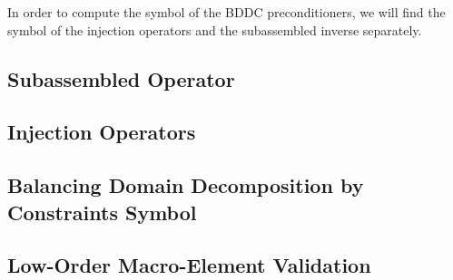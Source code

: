 In order to compute the symbol of the BDDC preconditioners, we will find the symbol of the injection operators and the subassembled inverse separately.

\subsection{Subassembled Operator}


\subsection{Injection Operators}


\subsection{Balancing Domain Decomposition by Constraints Symbol}


\subsection{Low-Order Macro-Element Validation}

